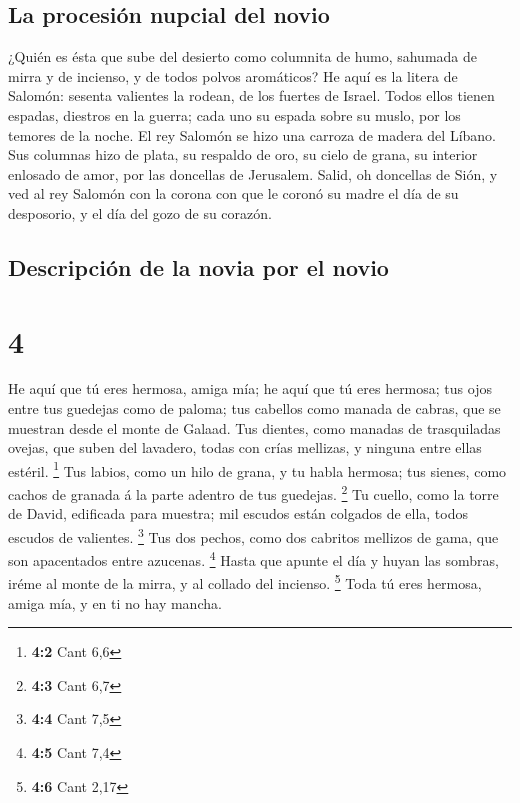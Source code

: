 \hypertarget{la-procesiuxf3n-nupcial-del-novio}{%
\subsection{La procesión nupcial del
novio}\label{la-procesiuxf3n-nupcial-del-novio}}

 ¿Quién es ésta que sube del desierto como columnita de
humo, sahumada de mirra y de incienso, y de todos polvos aromáticos?
 He aquí es la litera de Salomón: sesenta valientes la
rodean, de los fuertes de Israel.  Todos ellos tienen
espadas, diestros en la guerra; cada uno su espada sobre su muslo, por
los temores de la noche.  El rey Salomón se hizo una carroza
de madera del Líbano.  Sus columnas hizo de plata, su
respaldo de oro, su cielo de grana, su interior enlosado de amor, por
las doncellas de Jerusalem.  Salid, oh doncellas de Sión, y
ved al rey Salomón con la corona con que le coronó su madre el día de su
desposorio, y el día del gozo de su corazón.

\hypertarget{descripciuxf3n-de-la-novia-por-el-novio}{%
\subsection{Descripción de la novia por el
novio}\label{descripciuxf3n-de-la-novia-por-el-novio}}

\hypertarget{section-3}{%
\section{4}\label{section-3}}

 He aquí que tú eres hermosa, amiga mía; he aquí que tú eres
hermosa; tus ojos entre tus guedejas como de paloma; tus cabellos como
manada de cabras, que se muestran desde el monte de Galaad. 
Tus dientes, como manadas de trasquiladas ovejas, que suben del
lavadero, todas con crías mellizas, y ninguna entre ellas estéril.
\footnote{\textbf{4:2} Cant 6,6}  Tus labios, como un hilo
de grana, y tu habla hermosa; tus sienes, como cachos de granada á la
parte adentro de tus guedejas. \footnote{\textbf{4:3} Cant 6,7}
 Tu cuello, como la torre de David, edificada para muestra;
mil escudos están colgados de ella, todos escudos de valientes.
\footnote{\textbf{4:4} Cant 7,5}  Tus dos pechos, como dos
cabritos mellizos de gama, que son apacentados entre azucenas.
\footnote{\textbf{4:5} Cant 7,4}  Hasta que apunte el día y
huyan las sombras, iréme al monte de la mirra, y al collado del
incienso. \footnote{\textbf{4:6} Cant 2,17}  Toda tú eres
hermosa, amiga mía, y en ti no hay mancha.

